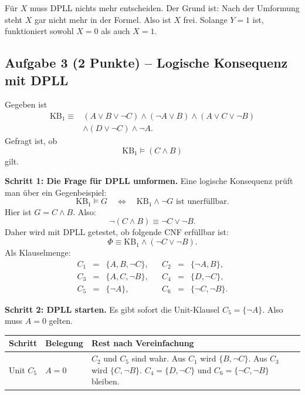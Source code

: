 \documentclass[a4paper,12pt]{article}
\begin{document}
F\"ur $X$ muss DPLL nichts mehr entscheiden. Der Grund ist: Nach der
Umformung steht $X$ gar nicht mehr in der Formel. Also ist $X$ frei.
Solange $Y=1$ ist, funktioniert sowohl $X=0$ als auch $X=1$.

\medskip
\noindent{}

\newpage

\subsection*{Aufgabe 3 \textnormal{(2 Punkte)} -- Logische Konsequenz mit DPLL}

Gegeben ist
\begin{align*}
\mathrm{KB}_1 \equiv {}&
(A \vee B \vee \neg C)
\wedge (\neg A \vee B)
\wedge (A \vee C \vee \neg B) \\
&\wedge (D \vee \neg C)
\wedge \neg A.
\end{align*}
Gefragt ist, ob
\[
\mathrm{KB}_1 \models (C \wedge B)
\]
gilt.

\medskip
\textbf{Schritt 1: Die Frage f\"ur DPLL umformen.}
Eine logische Konsequenz pr\"uft man \"uber ein Gegenbeispiel:
\[
\mathrm{KB}_1 \models G
\quad\Longleftrightarrow\quad
\mathrm{KB}_1 \wedge \neg G \text{ ist unerf\"ullbar}.
\]
Hier ist $G = C \wedge B$. Also:
\[
\neg(C \wedge B) \equiv \neg C \vee \neg B.
\]
Daher wird mit DPLL getestet, ob folgende CNF erf\"ullbar ist:
\[
\Phi \equiv \mathrm{KB}_1 \wedge (\neg C \vee \neg B).
\]
Als Klauselmenge:
\[
\begin{array}{rclcrcl}
C_1 &=& \{A,B,\neg C\},       && C_2 &=& \{\neg A,B\},\\
C_3 &=& \{A,C,\neg B\},       && C_4 &=& \{D,\neg C\},\\
C_5 &=& \{\neg A\},           && C_6 &=& \{\neg C,\neg B\}.
\end{array}
\]

\medskip
\textbf{Schritt 2: DPLL starten.}
Es gibt sofort die Unit-Klausel $C_5=\{\neg A\}$.
Also muss $A=0$ gelten.

\begin{center}
\renewcommand{\arraystretch}{1.25}
\begin{tabular}{p{}p{}p{}}
\toprule
Schritt & Belegung & Rest nach Vereinfachung \\
\midrule
Unit $C_5$
& $A=0$
& $C_2$ und $C_5$ sind wahr.
  Aus $C_1$ wird $\{B,\neg C\}$.
  Aus $C_3$ wird $\{C,\neg B\}$.
  $C_4=\{D,\neg C\}$ und $C_6=\{\neg C,\neg B\}$ bleiben. \\
\bottomrule
\end{tabular}
\end{center}
\end{document}
